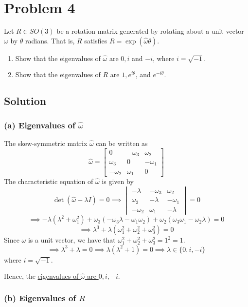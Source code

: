 \section*{Problem 4}

Let \(R \in S O(3)\) be a rotation matrix generated by rotating about a unit vector \(\omega \) by \(\theta \) radians.
That is, \(R\) satisfies \(R=\exp (\hat{\omega} \theta)\).
\begin{enumerate}[label= (\alph*)]
    \item Show that the eigenvalues of \(\hat{\omega}\) are \(0, i\) and \(-i\), where \(i=\sqrt{-1}\).
    \item Show that the eigenvalues of \(R\) are \(1, e^{i \theta}\), and \(e^{-i \theta}\).
\end{enumerate}

\subsection*{Solution}

\subsubsection*{(a) Eigenvalues of \(\hat{\omega}\)}

The skew-symmetric matrix \(\hat{\omega}\) can be written as
\[
    \hat{\omega} = \begin{bmatrix}
        0           & -\omega_{3} & \omega_{2}  \\
        \omega_{3}  & 0           & -\omega_{1} \\
        -\omega_{2} & \omega_{1}  & 0
    \end{bmatrix}
\]
The characteristic equation of \(\hat{\omega}\) is given by
\[
    \det(\hat{\omega} - \lambda I) = 0
    \implies
    \begin{vmatrix}
        -\lambda    & -\omega_{3} & \omega_{2}  \\
        \omega_{3}  & -\lambda    & -\omega_{1} \\
        -\omega_{2} & \omega_{1}  & -\lambda
    \end{vmatrix}
    = 0
\]
\[
    \implies
    -\lambda (\lambda^{2} + \omega_{1}^{2}) + \omega_{3} (-\omega_{3} \lambda - \omega_{1} \omega_{2}) + \omega_{2} (\omega_{3} \omega_{1} - \omega_{2} \lambda) = 0
\]
\[
    \implies
    \lambda^{3} + \lambda (\omega_{1}^{2} + \omega_{2}^{2} + \omega_{3}^{2}) = 0
\]
Since \( \omega \) is a unit vector, we have that \( \omega_{1}^{2} + \omega_{2}^{2} + \omega_{3}^{2} = 1^2 = 1 \).
\[
    \implies
    \lambda^{3} + \lambda = 0
    \implies
    \lambda (\lambda^{2} + 1) = 0
    \implies
    \lambda \in \{ 0, i, -i \}
\]
where \( i = \sqrt{-1} \).

Hence, the \underline{eigenvalues of \( \hat{\omega} \) are \( 0, i, -i \)}.

\subsubsection*{(b) Eigenvalues of \( R \)}
